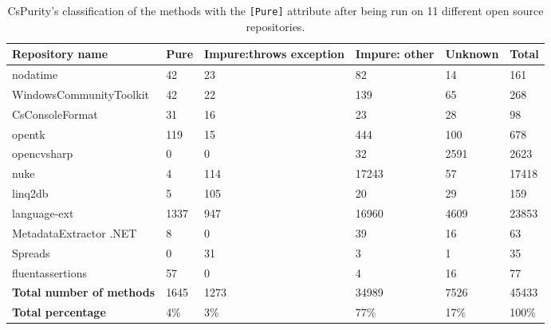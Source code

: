 \documentclass[a4paper,12pt]{article}
\begin{document}
\begin{table}[H]
  \small
  \caption{CsPurity's classification of the methods with the \texttt{[Pure]} attribute after being run on 11 different open source repositories.}
  \label{tab:results-pure-methods}
  \centering
  \begin{tabular}{|l|lp{2.8cm}p{1.4cm}l|l|}
    \hline
    \textbf{Repository name} & \textbf{Pure} & \textbf{Impure:\newline throws exception} & \textbf{Impure: other} & \textbf{Unknown} & \textbf{Total} \\
    \hline
    nodatime                & 42   & 23   & 82    & 14   & 161   \\
    WindowsCommunityToolkit & 42   & 22   & 139   & 65   & 268   \\
    CsConsoleFormat         & 31   & 16   & 23    & 28   & 98    \\
    opentk                  & 119  & 15   & 444   & 100  & 678   \\
    opencvsharp             & 0    & 0    & 32    & 2591 & 2623  \\
    nuke                    & 4    & 114  & 17243 & 57   & 17418 \\
    linq2db                 & 5    & 105  & 20    & 29   & 159   \\
    language-ext            & 1337 & 947  & 16960 & 4609 & 23853 \\
    MetadataExtractor .NET  & 8    & 0    & 39    & 16   & 63    \\
    Spreads                 & 0    & 31   & 3     & 1    & 35    \\
    fluentassertions        & 57   & 0    & 4     & 16   & 77    \\
    \hline
    \rowcolor{lightgray} \textbf{Total number of methods} & 1645 & 1273 & 34989 & 7526 & \cellcolor{white} 45433 \\
    \rowcolor{lightgray} \textbf{Total percentage}        & 4\%  & 3\%  & 77\%  & 17\% & \cellcolor{white} 100\% \\
    \hline
  \end{tabular}
\end{table}
\end{document}
